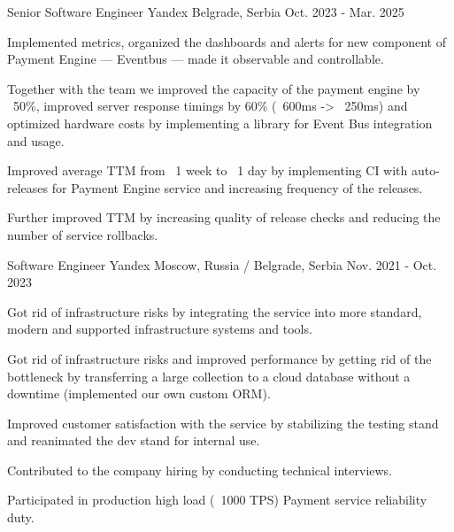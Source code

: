 

\begin{cventries}

  \cventry
    {Senior Software Engineer} %
    {Yandex} %
    {Belgrade, Serbia} %
    {Oct. 2023 - Mar. 2025} %
    {
      \begin{cvitems} %
        \item {Implemented metrics, organized the dashboards and alerts for new component of Payment Engine — Eventbus — made it observable and controllable.}
        \item {Together with the team we improved the capacity of the payment engine by ~50\%, improved server response timings by 60\% (~600ms -> ~250ms) and optimized hardware costs by implementing a library for Event Bus integration and usage.}
        \item {Improved average TTM from ~1 week to ~1 day by implementing CI with auto-releases for Payment Engine service and increasing frequency of the releases.}
        \item {Further improved TTM by increasing quality of release checks and reducing the number of service rollbacks.}
      \end{cvitems}
    }
  \cventry
    {Software Engineer} %
    {Yandex} %
    {Moscow, Russia / Belgrade, Serbia} %
    {Nov. 2021 - Oct. 2023} %
    {
      \begin{cvitems} %
        \item {Got rid of infrastructure risks by integrating the service into more standard, modern and supported infrastructure systems and tools.}
        \item {Got rid of infrastructure risks and improved performance by getting rid of the bottleneck by transferring a large collection to a cloud database without a downtime (implemented our own custom ORM).}
        \item {Improved customer satisfaction with the service by stabilizing the testing stand and reanimated the dev stand for internal use.}
        \item {Contributed to the company hiring by conducting technical interviews.}
        \item {Participated in production high load (~1000 TPS) Payment service reliability duty.}
      \end{cvitems}
}


\end{cventries}
